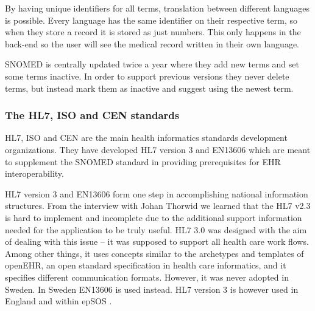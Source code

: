 \documentclass[14pt]{article}
\begin{document}
By having unique identifiers for all terms, translation between different languages is possible. Every language has the same identifier on their respective term, so when they store a record it is stored as just numbers. This only happens in the back-end so the user will see the medical record written in their own language.

\gls{SNOMED} is centrally updated twice a year where they add new terms and set some terms inactive. In order to support previous versions they never delete terms, but instead mark them as inactive and suggest using the newest term.\cite{annavik}

\subsubsection{The HL7, ISO and CEN standards}
\gls{HL7}, \gls{ISO} and \gls{CEN} are the main health informatics standards development organizations. They have developed HL7 version 3 and \gls{EN13606} which are meant to supplement the \gls{SNOMED} standard in providing prerequisites for EHR \gls{interoperability}.

HL7 version 3 and \gls{EN13606} form one step in accomplishing national information structures. From the interview with Johan Thorwid \cite{Cambio} we learned that the HL7 v2.3 is hard to implement and incomplete due to the additional support information needed for the application to be truly useful. HL7 3.0 was designed with the aim of dealing with this issue – it was supposed to support all health care work flows. Among other things, it uses concepts similar to the archetypes and templates of \gls{openEHR}, an open standard specification in health care informatics, and it specifies different communication formats. However, it was never adopted in Sweden. In Sweden \gls{EN13606} is used instead. HL7 version 3 is however used in England \cite{Cambio} and within epSOS \cite{epSOS}.
\end{document}
